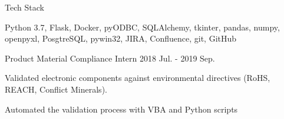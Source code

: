 \begin{cventries}
  \cventrytwopositions
    {Tech Stack} %
    {} %
    {} %
    {}
    {
      \begin{cvitems}
        \item {Python 3.7, Flask, Docker, pyODBC, SQLAlchemy, tkinter, pandas, numpy, openpyxl, PosgtreSQL, pywin32, JIRA, Confluence, git, GitHub}
      \end{cvitems}
    }
    {Product Material Compliance Intern} %
    {2018 Jul. - 2019 Sep.} %
    {
      \begin{cvitems} %
        \item {Validated electronic components against environmental directives (RoHS, REACH, Conflict Minerals).}
        \item {Automated the validation process with VBA and Python scripts}
      \end{cvitems}
    }

\end{cventries}
